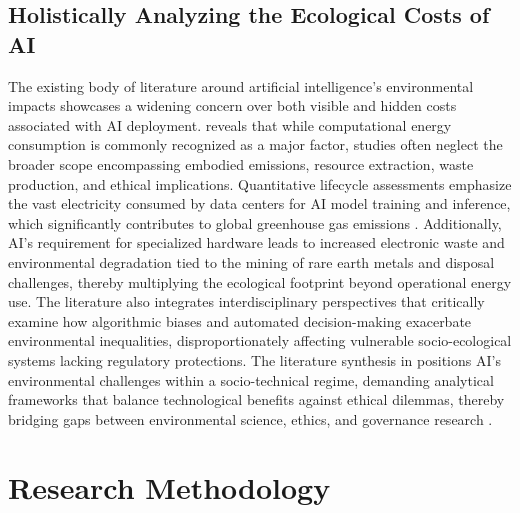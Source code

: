 \documentclass[a4paper, 12pt]{article}
\begin{document}
\subsection{Holistically Analyzing the Ecological Costs of AI}
The existing body of literature around artificial intelligence's environmental impacts showcases a widening concern over both visible and hidden costs associated with AI deployment. \citet{Zhuk2023} reveals that while computational energy consumption is commonly recognized as a major factor, studies often neglect the broader scope encompassing embodied emissions, resource extraction, waste production, and ethical implications. Quantitative lifecycle assessments emphasize the vast electricity consumed by data centers for AI model training and inference, which significantly contributes to global greenhouse gas emissions \citep{Zhuk2023}. Additionally, AI's requirement for specialized hardware leads to increased electronic waste and environmental degradation tied to the mining of rare earth metals and disposal challenges, thereby multiplying the ecological footprint beyond operational energy use. The literature also integrates interdisciplinary perspectives that critically examine how algorithmic biases and automated decision-making exacerbate environmental inequalities, disproportionately affecting vulnerable socio-ecological systems lacking regulatory protections. The literature synthesis in \citet{Zhuk2023} positions AI's environmental challenges within a socio-technical regime, demanding analytical frameworks that balance technological benefits against ethical dilemmas, thereby bridging gaps between environmental science, ethics, and governance research \citep[p.~935--940]{Zhuk2023}.
\section{Research Methodology}
\end{document}
